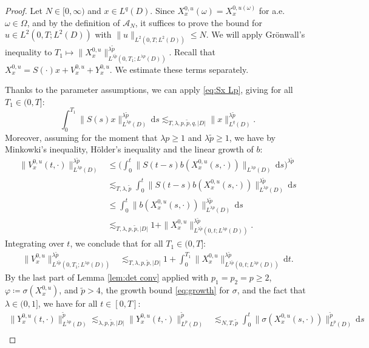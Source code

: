 \documentclass[10pt,a4paper]{amsart}
\numberwithin{equation}{section}
\newcommand{\ceqq}{\coloneqq}
\newcommand{\Om}{\Omega}
\newcommand{\om}{\omega}
\newcommand{\A}{{\mathcal A}}
\newcommand{\dd}{\,\mathrm{d}}
\begin{document}
\begin{proof}
Let $N\in[0,\infty)$ and $x\in L^q(D)$. 
Since $X_x^{0,u}(\om)=X_x^{0,u(\om)}$ for a.e.\ $\om\in\Om$, and by the definition of $\A_N$, it suffices to prove the bound for $u\in L^2(0,T;L^2(D))$ with $\|u\|_{L^2(0,T;L^2(D))}\leq N$. 
We will apply Gr\"onwall's inequality to $T_1\mapsto \|X_x^{0,u}\|_{L^{\lambda\tilde p}(0,T_1;L^{\lambda p}(D))}^{\lambda\tilde p}$. Recall that $X_x^{0,u}=S(\cdot)x+V_x^{0,u}+Y_x^{0,u}$. We estimate these terms separately.  

Thanks to the parameter assumptions, we can apply \eqref{eq:Sx Lp}, giving for all $T_1\in(0,T]$:
\[
\int_0^{T_1}\|S(s)x\|_{L^{\lambda p}(D)}^{\lambda \tilde p}\dd s 
 \lesssim_{T,\lambda,p,\tilde p,q,|D|} \|x\|_{L^q(D)}^{\lambda\tilde p}.
\]  
Moreover, assuming for the moment that $\lambda p\geq 1$ and $\lambda\tilde p\geq 1$, we have by Minkowki's inequality,  H\"older's inequality and the linear growth of $b$:
\begin{align*}
\|V_x^{0,u}(t,\cdot)\|_{L^{\lambda p}(D)}^{\lambda\tilde p}
&\leq \Big(\int_0^t\|S(t-s)b(X_x^{0,u}(s,\cdot))\|_{L^{\lambda p}(D)}\dd s\Big)^{\lambda\tilde p}\\
&\lesssim_{T,\lambda,\tilde p} \int_0^t\|S(t-s)b(X_x^{0,u}(s,\cdot))\|_{L^{\lambda p}(D)}^{\lambda\tilde p}\dd s \\
&\leq \int_0^t\|b(X_x^{0,u}(s,\cdot))\|_{L^{\lambda p}(D)}^{\lambda\tilde p}\dd s\\
&\lesssim_{T,\lambda,p,\tilde p,|D|} 1+ \|X_x^{0,u}\|_{L^{\lambda\tilde p}(0,t;L^{\lambda p}(D))}^{\lambda\tilde p}.
\end{align*}
Integrating over $t$, we conclude that for all $T_1\in(0,T]$:
\begin{align*}
\|V_x^{0,u}\|_{L^{\lambda\tilde p}(0,T_1;L^{\lambda p}(D))}^{\lambda\tilde p}
&\lesssim_{T,\lambda,p,\tilde p,|D|} 1+
\int_0^{T_1}\|X_x^{0,u}\|_{L^{\lambda\tilde p}(0,t;L^{\lambda p}(D))}^{\lambda\tilde p} \dd t.
\end{align*} 
By the last part of Lemma \ref{lem:det conv} applied with $p_1=p_2= p\geq 2$, $\varphi\ceqq \sigma(X_x^{0,u})$, and $\tilde p>4$, the growth bound \eqref{eq:growth} for $\sigma$, and the fact that $\lambda \in (0,1]$, we have for all $t\in[0,T]$:
\begin{align*}
\|Y_x^{0,u}(t,\cdot)\|_{L^{\lambda p}(D)}^{\tilde p} \lesssim_{\lambda,p,\tilde p,|D|}
  \|Y_x^{0,u}(t,\cdot)\|_{L^{p}(D)}^{\tilde p} 
  &\lesssim_{N,T,\tilde p} \int_0^t \|\sigma(X_x^{0,u}(s,\cdot))\|_{L^{p}(D)}^{\tilde p}\dd s\\

\end{align*}
\end{proof}
\end{document}
